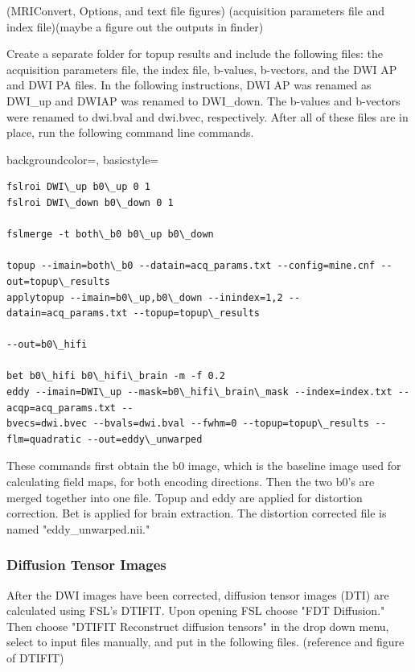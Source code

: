 (MRIConvert, Options, and text file figures) (acquisition parameters file and index file)(maybe a figure out the outputs in finder)

Create a separate folder for topup results and include the following files: the acquisition parameters file, the index file, b-values, b-vectors, and the DWI AP and DWI PA files. In the following instructions, DWI AP was renamed as DWI\_up and DWIAP was renamed to DWI\_down. The b-values and b-vectors were renamed to dwi.bval and dwi.bvec, respectively. After all of these files are in place, run the following command line commands.

{
    backgroundcolor=\color{white},
    basicstyle=\scriptsize\color{black}\ttfamily
}

\begin{lstlisting}[style=DOS]
fslroi DWI\_up b0\_up 0 1
fslroi DWI\_down b0\_down 0 1

fslmerge -t both\_b0 b0\_up b0\_down

topup --imain=both\_b0 --datain=acq_params.txt --config=mine.cnf --out=topup\_results
applytopup --imain=b0\_up,b0\_down --inindex=1,2 --datain=acq_params.txt --topup=topup\_results 

--out=b0\_hifi

bet b0\_hifi b0\_hifi\_brain -m -f 0.2
eddy --imain=DWI\_up --mask=b0\_hifi\_brain\_mask --index=index.txt --acqp=acq_params.txt --
bvecs=dwi.bvec --bvals=dwi.bval --fwhm=0 --topup=topup\_results --flm=quadratic --out=eddy\_unwarped

\end{lstlisting}

These commands first obtain the b0 image, which is the baseline image used for calculating field maps, for both encoding directions. Then the two b0's are merged together into one file. Topup and eddy are applied for distortion correction. Bet is applied for brain extraction. The distortion corrected file is named "eddy\_unwarped.nii."

\subsubsection{Diffusion Tensor Images}

After the DWI images have been corrected, diffusion tensor images (DTI) are calculated using FSL's DTIFIT. Upon opening FSL choose "FDT Diffusion." Then choose "DTIFIT Reconstruct diffusion tensors" in the drop down menu, select to input files manually, and put in the following files. (reference and figure of DTIFIT) 

